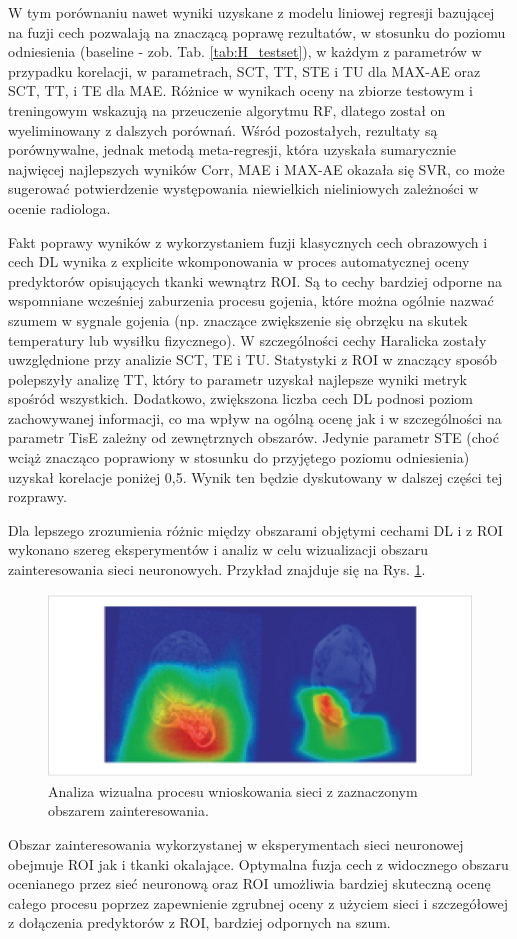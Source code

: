 W tym porównaniu nawet wyniki uzyskane z modelu liniowej regresji bazującej na fuzji cech pozwalają na znaczącą poprawę rezultatów, w stosunku do poziomu odniesienia (baseline - zob. Tab. \ref{tab:H_testset}), w każdym z parametrów w przypadku korelacji, w parametrach, SCT, TT, STE i TU dla MAX-AE oraz SCT, TT, i TE dla MAE. Różnice w wynikach oceny na zbiorze testowym i treningowym wskazują na przeuczenie algorytmu RF, dlatego został on wyeliminowany z dalszych porównań. Wśród pozostałych, rezultaty są porównywalne, jednak metodą meta-regresji, która uzyskała sumarycznie najwięcej najlepszych wyników Corr, MAE i MAX-AE okazała się SVR, co może sugerować potwierdzenie występowania niewielkich nieliniowych zależności w ocenie radiologa. 

Fakt poprawy wyników z wykorzystaniem fuzji klasycznych cech obrazowych i cech DL wynika z explicite wkomponowania w proces automatycznej oceny predyktorów opisujących tkanki wewnątrz ROI. Są to cechy bardziej odporne na wspomniane wcześniej zaburzenia procesu gojenia, które można ogólnie nazwać szumem w sygnale gojenia (np. znaczące zwiększenie się obrzęku na skutek temperatury lub wysiłku fizycznego). W szczególności cechy Haralicka zostały uwzględnione przy analizie SCT, TE i TU. Statystyki z ROI w znaczący sposób polepszyły analizę TT, który to parametr uzyskał najlepsze wyniki metryk spośród wszystkich. Dodatkowo, zwiększona liczba cech DL podnosi poziom zachowywanej informacji, co ma wpływ na ogólną ocenę jak i w szczególności na parametr TisE zależny od zewnętrznych obszarów. Jedynie parametr STE (choć wciąż znacząco poprawiony w stosunku do przyjętego poziomu odniesienia) uzyskał korelacje poniżej 0,5. Wynik ten będzie dyskutowany w dalszej części tej rozprawy.

Dla lepszego zrozumienia różnic między obszarami objętymi cechami DL i z ROI wykonano szereg eksperymentów i analiz w celu wizualizacji obszaru zainteresowania sieci neuronowych. Przykład znajduje się na Rys. \ref{fig:XAI}.  
\begin{figure}[h!]
	\centering
	\includegraphics[width=1\textwidth]{figures/XAI.jpg}
	\caption{Analiza wizualna procesu wnioskowania sieci z zaznaczonym obszarem zainteresowania.}\label{fig:XAI}
\end{figure}
Obszar zainteresowania wykorzystanej w eksperymentach sieci neuronowej obejmuje ROI jak i tkanki okalające. Optymalna fuzja cech z widocznego obszaru ocenianego przez sieć neuronową oraz ROI umożliwia bardziej skuteczną ocenę całego procesu poprzez zapewnienie zgrubnej oceny z użyciem sieci i szczegółowej z dołączenia predyktorów z ROI, bardziej odpornych na szum. 

